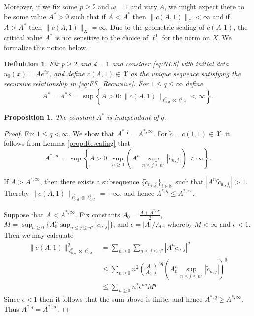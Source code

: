 \documentclass{article}
\newtheorem{proposition}[theorem]{Proposition}
\newtheorem{definition}[theorem]{Definition}
\newcommand{\eps}{\epsilon}
\newcommand{\N}{\mathbb{N}}
\newcommand{\cX}{\mathcal{X}}
\begin{document}
 Moreover, if we fix some $p\geq 2 $ and $\omega =1$ and vary $A$,  we might expect there to be some value $A^* >0 $ such that if $A < A^*$ then $ \| c(A,1) \|_X < \infty$ and if $ A > A^*$ then $ \| c(A,1) \|_X = \infty$.  
 Due to the geometric scaling of $c(A,1)$, the critical value $A^*$ is not sensitive to the choice of $ \ell^1$ for the norm on $X$. 
 We formalize this notion below. 
 \begin{definition}
 	Fix $ p \geq 2$ and $ d =1$ and consider   \eqref{eq:NLS}  	 with initial data $u_0(x) =   A e^{ i   x}$, and 
 	define $  c(A,1) \in \cX$ as the unique sequence  satisfying  the recursive relationship in \eqref{eq:FF_Recursive}. 
 	For $ 1 \leq q \leq \infty$ define 
 	\[
 	A^* = A^{*,q} = \sup \left\{ A> 0 : \| c(A,1) \|_{\ell^q_{0,d} \otimes \ell^q_{0,d}}  < \infty
	\right\} .
 	\]
 \end{definition}
\begin{proposition}
	The constant $ A^*$ is independant of $q$. 
\end{proposition}
\begin{proof}
	Fix $ 1 \leq q < \infty$. We show that $ A^{*,q} = A^{*,\infty}$. For  $ \tilde{c} = c(1,1) \in \cX$, it follows from Lemma \ref{prop:Rescaling} that 
	\[
	A^{*,\infty} = \sup 
	\left\{ 
	A > 0 : \sup_{n \geq 0} \left( A^n \sup_{n \leq j \leq n^2} |\tilde{c}_{n,j}| \right) < \infty
	\right\} .
	\]
	
	If $ A > A^{*,\infty}$, then there exists a subsequence $\{ \tilde{c}_{n_i,j_i}\}_{i \in \N}$ such that $ | A^{n_i} \tilde{c}_{n_i,j_i} | >1$. 
	Thereby $ \| c(A,1) \|_{\ell^q_{0,d} \otimes \ell^q_{0,d}} = + \infty$, and hence $ A^{*,q}  \leq A^{*,\infty}$.  
	
		Suppose that $ A < A^{*,\infty}$. 
		Fix constants $ A_0 = \frac{A+A^{*,\infty}}{2}$,   $ M = \sup_{n \geq 0} \{ A_0^n \sup_{n \leq j \leq n^2} |\tilde{c}_{n,j}|  \} $, and  $ \epsilon = | A|/A_0 $, whereby $M< \infty$ and $ \epsilon < 1$. 
		Then we may calculate 
		\begin{align*}
			\| c(A,1) \|^q_{\ell^q_{0,d} \otimes \ell^q_{0,d}} &=  \sum_{n \geq 0 } \sum_{ n \leq j \leq n^2} | A^n \tilde{c}_{n,j} |^q \\
			&\leq \sum_{n \geq 0 } n^2
			 \left(
			  \frac{|A|}{A_0}
			\right)^{nq}
			 \left(
			 A_0^n \sup_{n \leq j \leq n^2} |\tilde{c}_{n,j}|
			\right)^q \\
			&\leq \sum_{n \geq 0 } n^2 \eps^{nq} M^{q}
		\end{align*}
		Since $ \eps < 1$ then it follows that the sum above is finite, and hence $ A^{*,q}  \geq A^{*,\infty}$.   Thus $ A^{*,q}  = A^{*,\infty}$.   
	
\end{proof} 
\end{document}
